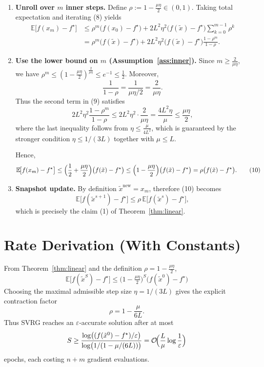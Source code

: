 \documentclass{article}
\newcommand{\E}{\mathbb{E}}
\begin{document}
\begin{enumerate}[label=[Step \arabic*], leftmargin=*]
\item \textbf{Unroll over $m$ inner steps.}  
Define $\rho:=1-\frac{\mu\eta}{2}\in(0,1)$. Taking total expectation and iterating (8) yields
\[
\begin{aligned}
\E\!\bigl[f(x_{m})-f^{\star}\bigr]
&\le \rho^{m}\bigl(f(x_{0})-f^{\star}\bigr)
   +2L^{2}\eta^{2}\bigl(f(\tilde{x})-f^{\star}\bigr)\sum_{k=0}^{m-1}\rho^{k}\\
&= \rho^{m}\bigl(f(\tilde{x})-f^{\star}\bigr)
   +2L^{2}\eta^{2}\bigl(f(\tilde{x})-f^{\star}\bigr)\frac{1-\rho^{m}}{1-\rho}.
\end{aligned}
\tag{9}
\]

\item \textbf{Use the lower bound on $m$ (Assumption~\ref{ass:inner}).}  
Since $m\ge \frac{2}{\mu\eta}$, we have $\rho^{m}\le (1-\frac{\mu\eta}{2})^{\frac{2}{\mu\eta}}\le e^{-1}\le \frac12$. Moreover,
\[
\frac{1}{1-\rho}= \frac{1}{\mu\eta/2}= \frac{2}{\mu\eta}.
\]
Thus the second term in (9) satisfies
\[
2L^{2}\eta^{2}\frac{1-\rho^{m}}{1-\rho}
\le 2L^{2}\eta^{2}\cdot\frac{2}{\mu\eta}= \frac{4L^{2}\eta}{\mu}
\le \frac{\mu\eta}{2},
\]
where the last inequality follows from $\eta\le \frac{\mu}{4L^{2}}$, which is guaranteed by the stronger condition $\eta\le 1/(3L)$ together with $\mu\le L$.

Hence,
\[
\E\!\bigl[f(x_{m})-f^{\star}\bigr]\le
\Bigl(\frac12+\frac{\mu\eta}{2}\Bigr)\bigl(f(\tilde{x})-f^{\star}\bigr)
\le \Bigl(1-\frac{\mu\eta}{2}\Bigr)\bigl(f(\tilde{x})-f^{\star}\bigr)
= \rho\bigl(f(\tilde{x})-f^{\star}\bigr). \tag{10}
\]

\item \textbf{Snapshot update.}  
By definition $\tilde{x}^{\text{new}}=x_{m}$, therefore (10) becomes
\[
\E\!\bigl[f(\tilde{x}^{s+1})-f^{\star}\bigr]\le
\rho\,\E\!\bigl[f(\tilde{x}^{s})-f^{\star}\bigr],
\]
which is precisely the claim (1) of Theorem~\ref{thm:linear}. \qedhere
\end{enumerate}

\section*{Rate Derivation (With Constants)}
From Theorem~\ref{thm:linear} and the definition $\rho=1-\frac{\mu\eta}{2}$,
\[
\boxed{\;
\E\!\bigl[f(\tilde{x}^{S})-f^{\star}\bigr]\le
\bigl(1-\tfrac{\mu\eta}{2}\bigr)^{S}\bigl(f(\tilde{x}^{0})-f^{\star}\bigr)
\;}
\]
Choosing the maximal admissible step size $\eta=1/(3L)$ gives the explicit contraction factor
\[
\rho = 1-\frac{\mu}{6L}.
\]
Thus SVRG reaches an $\varepsilon$‑accurate solution after at most
\[
S\ge \frac{\log\bigl((f(\tilde{x}^{0})-f^{\star})/\varepsilon\bigr)}{\log\bigl(1/(1-\mu/(6L))\bigr)}
= \mathcal{O}\!\Bigl(\frac{L}{\mu}\log\frac{1}{\varepsilon}\Bigr)
\]
epochs, each costing $n+m$ gradient evaluations.
\end{document}
